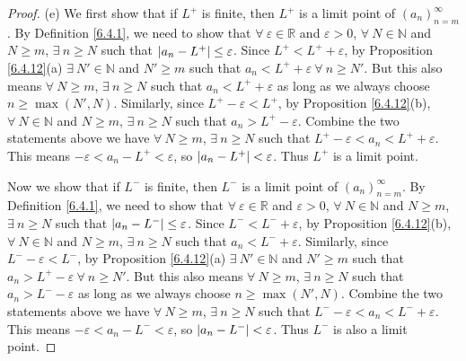 \begin{proof}{(e)}
We first show that if \(L^+\) is finite, then \(L^+\) is a limit point of \((a_n)_{n = m}^\infty\).
By Definition \ref{6.4.1}, we need to show that \(\forall\ \varepsilon \in \mathds{R}\) and \(\varepsilon > 0\), \(\forall\ N \in \mathds{N}\) and \(N \geq m\), \(\exists\ n \geq N\) such that \(\abs*{a_n - L^+} \leq \varepsilon\).
Since \(L^+ < L^+ + \varepsilon\), by Proposition \ref{6.4.12}(a) \(\exists\ N' \in \mathds{N}\) and \(N' \geq m\) such that \(a_n < L^+ + \varepsilon \ \forall\ n \geq N'\).
But this also means \(\forall\ N \geq m\), \(\exists\ n \geq N\) such that \(a_n < L^+ + \varepsilon\) as long as we always choose \(n \geq \max(N', N)\).
Similarly, since \(L^+ - \varepsilon < L^+\), by Proposition \ref{6.4.12}(b), \(\forall\ N \in \mathds{N}\) and \(N \geq m\), \(\exists\ n \geq N\) such that \(a_n > L^+ - \varepsilon\).
Combine the two statements above we have \(\forall\ N \geq m\), \(\exists\ n \geq N\) such that \(L^+ - \varepsilon < a_n < L^+ + \varepsilon\).
This means \(-\varepsilon < a_n - L^+ < \varepsilon\), so \(\abs*{a_n - L^+} < \varepsilon\).
Thus \(L^+\) is a limit point.

Now we show that if \(L^-\) is finite, then \(L^-\) is a limit point of \((a_n)_{n = m}^\infty\).
By Definition \ref{6.4.1}, we need to show that \(\forall\ \varepsilon \in \mathds{R}\) and \(\varepsilon > 0\), \(\forall\ N \in \mathds{N}\) and \(N \geq m\), \(\exists\ n \geq N\) such that \(\abs*{a_n - L^-} \leq \varepsilon\).
Since \(L^- < L^- + \varepsilon\), by Proposition \ref{6.4.12}(b), \(\forall\ N \in \mathds{N}\) and \(N \geq m\), \(\exists\ n \geq N\) such that \(a_n < L^- + \varepsilon\).
Similarly, since \(L^- - \varepsilon < L^-\), by Proposition \ref{6.4.12}(a) \(\exists\ N' \in \mathds{N}\) and \(N' \geq m\) such that \(a_n > L^+ - \varepsilon \ \forall\ n \geq N'\).
But this also means \(\forall\ N \geq m\), \(\exists\ n \geq N\) such that \(a_n > L^- - \varepsilon\) as long as we always choose \(n \geq \max(N', N)\).
Combine the two statements above we have \(\forall\ N \geq m\), \(\exists\ n \geq N\) such that \(L^- - \varepsilon < a_n < L^- + \varepsilon\).
This means \(-\varepsilon < a_n - L^- < \varepsilon\), so \(\abs*{a_n - L^-} < \varepsilon\).
Thus \(L^-\) is also a limit point.
\end{proof}

